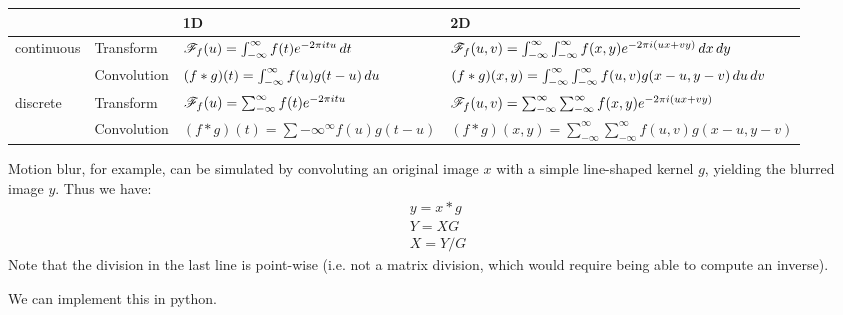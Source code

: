 \begin{table}[]
    \begin{tabular}{@{}llll@{}}
    \toprule
                                &             & 1D                                                                              & 2D                                                \\ 
    \midrule
    \multirow{2}{*}{continuous} & Transform   & $\mathscr{F}_f(u)  = \int_{-\infty}^{\infty} f(t) e^{-2\pi i t u} \mathop{dt}$         & $\mathscr{F}_f(u, v)  = \int_{-\infty}^{\infty} \int_{-\infty}^{\infty} f(x, y) e^{-2\pi i (ux + vy)} \mathop{dx} \mathop{dy}$         \\
                                & Convolution & $(f * g)(t)     = \int_{-\infty}^{\infty} f(u) g(t-u) \mathop{du}$                  & $(f * g)(x, y)     = \int_{-\infty}^{\infty} \int_{-\infty}^{\infty} f(u, v) g(x-u, y-v) \mathop{du} \mathop{dv}$                      \\
    \multirow{2}{*}{discrete}   & Transform   & $\mathscr{F}_f(u)  = \sum_{-\infty}^{\infty} f(t) e^{-2\pi i t u} $                & $\mathscr{F}_f(u, v)  = \sum_{-\infty}^{\infty} \sum_{-\infty}^{\infty} f(x, y) e^{-2\pi i (ux + vy)} $                \\
                                & Convolution & $(f * g)(t) = \sum{-\infty}^{\infty} f(u) g(t-u) $                              & $(f * g)(x, y) = \sum_{-\infty}^{\infty} \sum_{-\infty}^{\infty} f(u, v) g(x-u, y-v) $                         \\
    \end{tabular}
\end{table}

Motion blur, for example, can be simulated by convoluting an original image $x$ with a simple line-shaped kernel $g$, yielding the blurred image $y$.
Thus we have: 
\begin{equation}
    \begin{split}
        y = x * g \\
        Y = X G \\
        X = Y / G
    \end{split}
\end{equation}
Note that the division in the last line is point-wise (i.e. not a matrix division, which would require being able to compute an inverse).

We can implement this in python.

